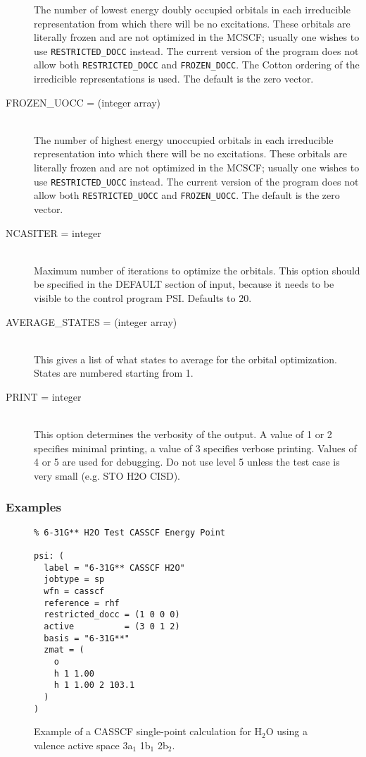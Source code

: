 \begin{description}
The number of lowest energy doubly occupied orbitals in each irreducible
representation from which there will be no excitations.  
These orbitals are literally frozen and are not optimized in the MCSCF;
usually one wishes to use {\tt RESTRICTED\_DOCC} instead.
The current version of the program does not allow both
{\tt RESTRICTED\_DOCC} and {\tt FROZEN\_DOCC}.
The Cotton ordering of the irredicible representations is used.
The default is the zero vector.
\item[FROZEN\_UOCC = (integer array)]\mbox{}\\
The number of highest energy unoccupied orbitals in each irreducible
representation into which there will be no excitations.
These orbitals are literally frozen and are not optimized in the MCSCF;
usually one wishes to use {\tt RESTRICTED\_UOCC} instead.
The current version of the program does not allow both
{\tt RESTRICTED\_UOCC} and {\tt FROZEN\_UOCC}.
The default is the zero vector.
\item[NCASITER = integer]\mbox{}\\
Maximum number of iterations to optimize the orbitals.  This option
should be specified in the DEFAULT section of input, because
it needs to be visible to the control program PSI.  Defaults to 20.
\item[AVERAGE\_STATES = (integer array)]\mbox{}\\
This gives a list of what states to average for the orbital 
optimization.  States are numbered starting from 1.
\item[PRINT = integer]\mbox{}\\
This option determines the verbosity of the output.  A value of 1 or
2 specifies minimal printing, a value of 3 specifies verbose printing.
Values of 4 or 5 are used for debugging.  Do not use level 5 unless
the test case is very small (e.g. STO H2O CISD).
\end{description}

\subsubsection{Examples}
\begin{figure}[h!]
\begin{verbatim}
% 6-31G** H2O Test CASSCF Energy Point
                                                                                
psi: (
  label = "6-31G** CASSCF H2O"
  jobtype = sp
  wfn = casscf
  reference = rhf
  restricted_docc = (1 0 0 0)
  active          = (3 0 1 2)
  basis = "6-31G**"
  zmat = (
    o
    h 1 1.00
    h 1 1.00 2 103.1
  )
)
\end{verbatim}
\caption{Example of a CASSCF single-point calculation for H$_2$O using
  a valence active space 3a$_1$ 1b$_1$ 2b$_2$.}
\label{ex:casscf-sp-1}
\end{figure}

